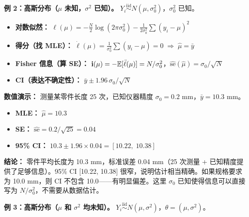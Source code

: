 \textbf{例 2：高斯分布（$\mu$ 未知，$\sigma^2$ 已知）。}
$Y_i \stackrel{\text{iid}}{\sim} N(\mu, \sigma_0^2)$，$\sigma_0^2$ 已知。

\begin{itemize}
    \item \textbf{对数似然：} $\ell(\mu) = -\frac{N}{2}\log(2\pi\sigma_0^2) - \frac{1}{2\sigma_0^2}\sum(y_i - \mu)^2$
    \item \textbf{得分（找 MLE）：} $\dot{\ell}(\mu) = \frac{1}{\sigma_0^2}\sum(y_i - \mu) = 0 \;\Rightarrow\; \hat{\mu} = \bar{y}$
    \item \textbf{Fisher 信息（算 SE）：} $\mathbf{i}(\mu) = -\mathbb{E}[\ddot{\ell}(\mu)] = N/\sigma_0^2$，$\widehat{\mathrm{se}}(\hat{\mu}) = \sigma_0/\sqrt{N}$
    \item \textbf{CI（表达不确定性）：} $\bar{y} \pm 1.96\,\sigma_0/\sqrt{N}$
\end{itemize}

\textbf{数值演示：} 测量某零件长度 25 次，已知仪器精度 $\sigma_0=0.2$ mm，$\bar{y}=10.3$ mm。

\begin{itemize}
    \item \textbf{MLE：} $\hat{\mu} = 10.3$
    \item \textbf{SE：} $\widehat{\mathrm{se}} = 0.2/\sqrt{25} = 0.04$
    \item \textbf{95\% CI：} $10.3 \pm 1.96\times 0.04 = [10.22,\; 10.38]$
\end{itemize}

\textbf{结论：} 零件平均长度为 10.3 mm，标准误差 0.04 mm（25 次测量 + 已知精度提供了足够信息）。95\% CI [10.22, 10.38] 很窄，说明估计相当精确。如果规格要求为 10.0 mm，则 CI 不包含 10.0——有明显偏差。这里 $\sigma_0$ 已知使得信息可以直接写为 $N/\sigma_0^2$，不需要从数据估计。

\textbf{例 3：高斯分布（$\mu$ 和 $\sigma^2$ 均未知）。}
$Y_i \stackrel{\text{iid}}{\sim} N(\mu, \sigma^2)$，$\theta = (\mu, \sigma^2)$。

